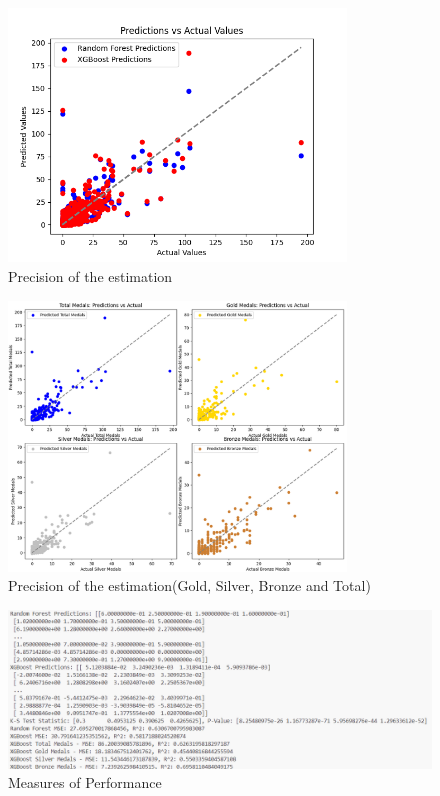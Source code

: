 \begin{figure}[htbp]
    \centering
    \includegraphics[width=0.8\textwidth]{./figures/K-S_0.png}
    \caption{Precision of the estimation}
    \label{fig:K-S_0}
\end{figure}

\begin{figure}[htbp]
    \centering
    \includegraphics[width=0.8\textwidth]{./figures/K-S_4.png}
    \caption{Precision of the estimation(Gold, Silver, Bronze and Total)}
    \label{fig:K-S_4}
\end{figure}

\begin{figure}[htbp]
    \centering
    \includegraphics[width=1\textwidth]{./figures/refer_KS_other.png}
    \caption{Measures of Performance}
    \label{fig:refer_KS_other}
\end{figure}

